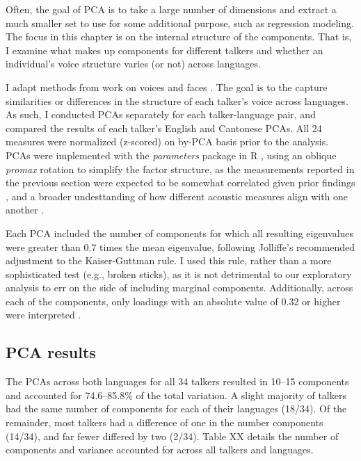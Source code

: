 Often, the goal of PCA is to take a large number of dimensions and extract a much smaller set to use for some additional purpose, such as regression modeling. The focus in this chapter is on the internal structure of the components. That is, I examine what makes up components for different talkers and whether an individual's voice structure varies (or not) across languages.  %

I adapt methods from work on voices \citep{lee_2019_acoustic,lee_2020_language} and faces \citep{burton_2016_faces,turk_1991_eigenfaces}. The goal is to the capture similarities or differences in the structure of each talker's voice across languages. As such, I conducted PCAs separately for each talker-language pair, and compared the results of each talker's English and Cantonese PCAs. All 24 measures were normalized (z-scored) on by-PCA basis prior to the analysis. PCAs were implemented with the \textit{parameters} package \citep{makowski_2019_parameters} in R \citep{r_2021}, using an oblique \textit{promax} rotation to simplify the factor structure, as the measurements reported in the previous section were expected to be somewhat correlated given prior findings \citep{lee_2019_acoustic}, and a broader undesttanding of how different acoustic measures align with one another \citep{kreiman_2014_theory, kreiman_2021_validating}.

Each PCA included the number of components for which all resulting eigenvalues were greater than 0.7 times the mean eigenvalue, following Jolliffe's \citep{jolliffe_2002_pca} recommended adjustment to the Kaiser-Guttman rule. I used this rule, rather than a more sophisticated test (e.g., broken sticks), as it is not detrimental to our exploratory analysis to err on the side of including marginal components. Additionally, across each of the components, only loadings with an absolute value of 0.32 or higher were interpreted \citep{lee_2019_acoustic,tabachnick_2013_statistics}.

\subsection{PCA results}\label{ch3:sec:pca_results} 
The PCAs across both languages for all 34 talkers resulted in 10--15 components and accounted for 74.6--85.8\% of the total variation. A slight majority of talkers had the same number of components for each of their languages (18/34). Of the remainder, most talkers had a difference of one in the number components (14/34), and far fewer differed by two (2/34). Table XX details the number of components and variance accounted for across all talkers and languages. 

